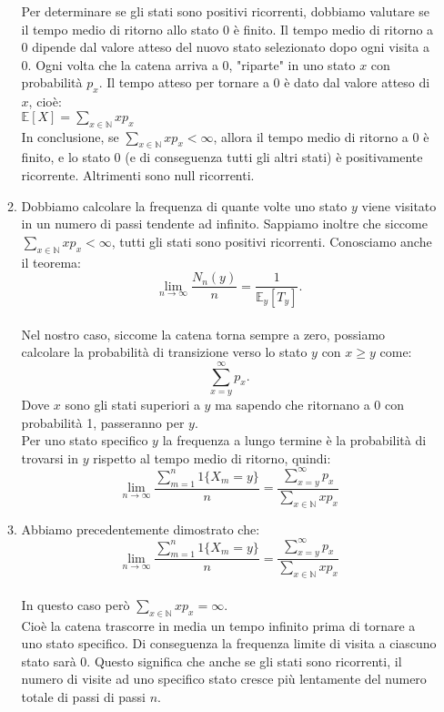 \documentclass[a4paper,12pt]{article}
\begin{document}
\begin{itemize}
\begin{enumerate}[label=\alph*)]
			Per determinare se gli stati sono positivi ricorrenti, dobbiamo valutare se il tempo medio di ritorno allo stato 0 è finito. Il tempo medio di ritorno a 
			0 dipende dal valore atteso del nuovo stato selezionato dopo ogni visita a 0. Ogni volta che la catena arriva a 0, "riparte" in uno stato $x$ con probabilità $p_x$. Il tempo atteso per tornare a 0 è dato dal valore atteso di $x$, cioè:\\
			$\mathbb{E}[X] = \sum_{x \in \mathbb{N}} x p_x
			$\\
			In conclusione, se \( \sum_{x \in \mathbb{N}} x p_x < \infty \), allora il tempo medio di ritorno a \(0\) è finito, e lo stato \(0\) (e di conseguenza tutti gli altri stati) è positivamente ricorrente. Altrimenti sono null ricorrenti.
			\item Dobbiamo calcolare la frequenza di quante volte uno stato $y$ viene visitato in un numero di passi tendente ad infinito. Sappiamo inoltre che siccome \( \sum_{x \in \mathbb{N}} x p_x < \infty \), tutti gli stati sono positivi ricorrenti. Conosciamo anche il teorema:\\
			\[
			\lim_{n \to \infty} \frac{N_n(y)}{n} = \frac{1}{\mathbb{E}_y[T_y]}.
			\]\\
			Nel nostro caso, siccome la catena torna sempre a zero, possiamo calcolare la probabilità di transizione verso lo stato $y$ con $x\geq y$ come:\\
			\[
			\sum_{x = y}^{\infty} p_x.
			\]
			Dove $x$ sono gli stati superiori a $y$ ma sapendo che ritornano a 0 con probabilità 1, passeranno per $y$.\\
			Per uno stato specifico $y$ la frequenza a lungo termine è la probabilità di trovarsi in $y$ rispetto al tempo medio di ritorno, quindi:\\
			\[
			\lim_{n \to \infty} \frac{\sum_{m=1}^n 1\{X_m = y\}}{n} = \frac{\sum_{x = y}^{\infty} p_x}{\sum_{x \in \mathbb{N}} x p_x}
			\]
			\item Abbiamo precedentemente dimostrato che:\\
			\[
			\lim_{n \to \infty} \frac{\sum_{m=1}^n 1\{X_m = y\}}{n} = \frac{\sum_{x = y}^{\infty} p_x}{\sum_{x \in \mathbb{N}} x p_x}
			\]\\
			In questo caso però \( \sum_{x \in \mathbb{N}} x p_x = \infty \).\\
			Cioè la catena trascorre in media un tempo infinito prima di tornare a uno stato specifico. Di conseguenza la frequenza limite di visita a ciascuno stato sarà 0. Questo significa che anche se gli stati sono ricorrenti, il numero di visite ad uno specifico stato cresce più lentamente del numero totale di passi di passi $n$. \\

\end{enumerate}
\end{itemize}
\end{document}
